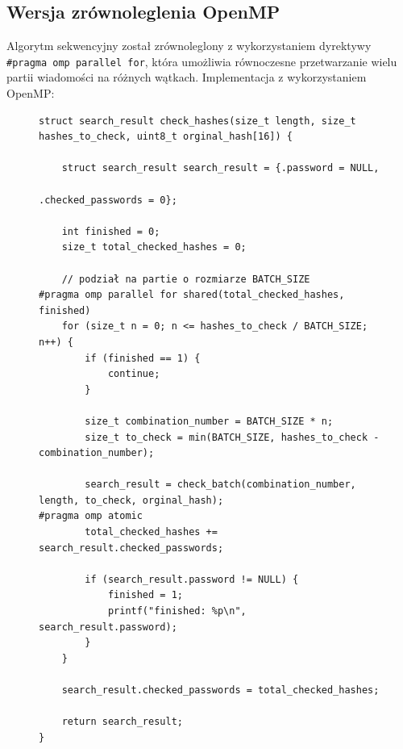 \documentclass[a4paper,12pt]{article}
\begin{document}
\subsection{Wersja zrównoleglenia OpenMP}
Algorytm sekwencyjny został zrównoleglony z wykorzystaniem dyrektywy \texttt{\#pragma omp parallel for}, która umożliwia równoczesne przetwarzanie wielu partii wiadomości na różnych wątkach. Implementacja z wykorzystaniem OpenMP:
\begin{figure}[H]
\begin{lstlisting}
struct search_result check_hashes(size_t length, size_t hashes_to_check, uint8_t orginal_hash[16]) {

    struct search_result search_result = {.password = NULL,
                                          .checked_passwords = 0};

    int finished = 0;
    size_t total_checked_hashes = 0;

    // podział na partie o rozmiarze BATCH_SIZE
#pragma omp parallel for shared(total_checked_hashes, finished)
    for (size_t n = 0; n <= hashes_to_check / BATCH_SIZE; n++) {
        if (finished == 1) {
            continue;
        }

        size_t combination_number = BATCH_SIZE * n;
        size_t to_check = min(BATCH_SIZE, hashes_to_check - combination_number);

        search_result = check_batch(combination_number, length, to_check, orginal_hash);
#pragma omp atomic
        total_checked_hashes += search_result.checked_passwords;

        if (search_result.password != NULL) {
            finished = 1;
            printf("finished: %p\n", search_result.password);
        }
    }

    search_result.checked_passwords = total_checked_hashes;

    return search_result;
}
\end{lstlisting}
\end{figure}

\newpage
\end{document}
